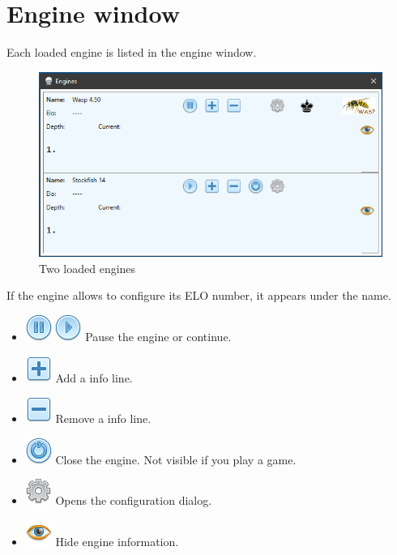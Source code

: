 \documentclass[11pt,a4paper]{article}
\begin{document}
\section{Engine window}

Each loaded engine is listed in the engine window.

\begin{figure}[H]
	\centering
	\includegraphics[scale=0.8]{EngineWindow1.png}
	\caption{Two loaded engines}
	\label{fig:EngineWindow1}
\end{figure}

If the engine allows to configure its ELO number, it appears under the name.
\begin{itemize}
	\item \includegraphics[scale=0.5]{control_pause_blue.png} \includegraphics[scale=0.5]{control_play_blue.png} Pause the engine or continue.
	\item \includegraphics[scale=0.5]{toggle_expand.png} Add a info line.
	\item \includegraphics[scale=0.5]{toggle.png} Remove a info line.
	\item \includegraphics[scale=0.5]{control_power_blue.png} Close the engine. Not visible if you play a game.
	\item \includegraphics[scale=0.5]{cog.png} Opens the configuration dialog.	
	\item \includegraphics[scale=0.5]{eye.png} Hide engine information.		
\end{itemize}
\end{document}
